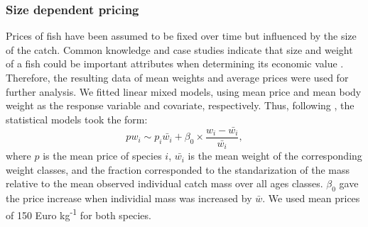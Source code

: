 \documentclass[12pt,oneline,a4paper,numbib]{ouparticle}
\numberwithin{equation}{subsection} %
\begin{document}
\subsubsection{Size dependent pricing}
\label{sec2.2.1}
Prices of fish have been assumed to be fixed over time but influenced by the size of the catch. Common knowledge and case studies indicate that size and weight of a fish could be important attributes when determining its economic value \cite{Zimmermann2011, Zimmermann2013}. Therefore, the resulting data of mean weights and average prices were used for further analysis. We fitted linear mixed models, using mean price and mean body weight as the response variable and covariate, respectively. Thus, following \cite{Zimmermann2011}, the statistical models took the form:  
\begin{equation}
 pw_{i} \sim p_i \bar{w_i} + \beta_0 \times \frac{w_i-\bar{w_i}}{\bar{w_i}},
\end{equation}
where $p$ is the mean price of species $i$, $\bar{w_i}$ is the mean weight of the corresponding weight classes, and the fraction corresponded to the standarization of the mass relative to the mean observed individual catch mass over all ages classes. $\beta_0$ gave the price increase when individial mass was increased by $\bar{w}$. We used mean prices of 150 Euro kg\textsuperscript{-1} for both species.
\begin{table}[!h]
\centering
\caption{Linear mass-prices estimated based on mean prices per mass age-classes. The price slopes $\beta_0$ were assumed to be similar to mean prices.}
\label{t:pricing}
\end{table}
\end{document}
